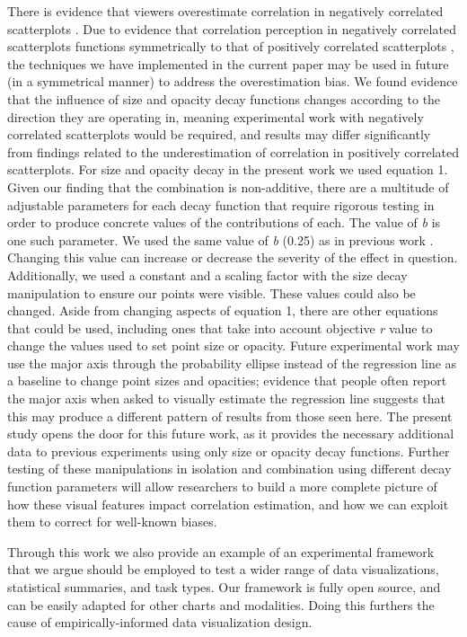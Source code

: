 \documentclass[manuscript, review, anonymous, screen]{acmart}
\begin{document}
There is evidence that viewers overestimate correlation in negatively
correlated scatterplots \citep{sher_2017}. Due to evidence that
correlation perception in negatively correlated scatterplots functions
symmetrically to that of positively correlated scatterplots
\citep{harrison_2014}, the techniques we have implemented in the current
paper may be used in future (in a symmetrical manner) to address the
overestimation bias. We found evidence that the influence of size and
opacity decay functions changes according to the direction they are
operating in, meaning experimental work with negatively correlated
scatterplots would be required, and results may differ significantly
from findings related to the underestimation of correlation in
positively correlated scatterplots. For size and opacity decay in the
present work we used equation 1. Given our finding that the combination
is non-additive, there are a multitude of adjustable parameters for each
decay function that require rigorous testing in order to produce
concrete values of the contributions of each. The value of \emph{b} is
one such parameter. We used the same value of \emph{b} (0.25) as in
previous work \citep{strain_2023, strain_2023b}. Changing this value can
increase or decrease the severity of the effect in question.
Additionally, we used a constant and a scaling factor with the size
decay manipulation to ensure our points were visible. These values could
also be changed. Aside from changing aspects of equation 1, there are
other equations that could be used, including ones that take into
account objective \emph{r} value to change the values used to set point
size or opacity. Future experimental work may use the major axis through
the probability ellipse instead of the regression line as a baseline to
change point sizes and opacities; evidence that people often report the
major axis when asked to visually estimate the regression line
\citep{collyer_1990} suggests that this may produce a different pattern
of results from those seen here. The present study opens the door for
this future work, as it provides the necessary additional data to
previous experiments using only size \citep{strain_2023b} or opacity
\citep{strain_2023} decay functions. Further testing of these
manipulations in isolation and combination using different decay
function parameters will allow researchers to build a more complete
picture of how these visual features impact correlation estimation, and
how we can exploit them to correct for well-known biases.

Through this work we also provide an example of an experimental
framework that we argue should be employed to test a wider range of data
visualizations, statistical summaries, and task types. Our framework is
fully open source, and can be easily adapted for other charts and
modalities. Doing this furthers the cause of empirically-informed data
visualization design.




\end{document}

